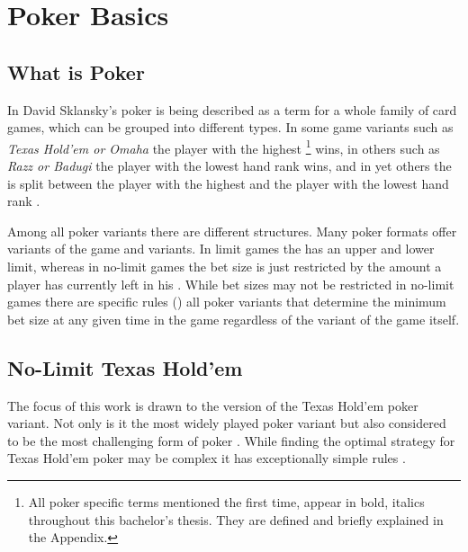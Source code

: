 

\chapter{Poker Basics}
\label{cha:pokerBasics}

\section{What is Poker}
In David Sklansky's \cite{theory_of_poker} poker is being described as a term for a whole family of card games, which can be grouped into different types. In some game variants such as  \textit{Texas Hold'em or Omaha} the player with the highest \footnote{All poker specific terms mentioned the first time, appear in bold, italics throughout this bachelor's thesis. They are defined and briefly explained in the Appendix.} wins, in others such as \textit{Razz or Badugi} the player with the lowest hand rank wins, and in yet others the  is split between the player with the highest and the player with the lowest hand rank .\par
Among all poker variants there are different  structures. Many poker formats offer  variants of the game and  variants. In limit games the  has an upper and lower limit, whereas in no-limit games the bet size is just restricted by the amount a player has currently left in his  \cite{theory_of_poker}. While bet sizes may not be restricted in no-limit games there are specific rules () all poker variants that determine the minimum bet size at any given time in the game regardless of the variant of the game itself.
\section{No-Limit Texas Hold'em}
The focus of this work is drawn to the  version of the Texas Hold'em poker variant. Not only is it the most widely played poker variant but also considered to be the most challenging form of poker \cite{strong_poker}. While finding the optimal strategy for Texas Hold'em poker may be complex it has exceptionally simple rules \cite{billings_phd}.

